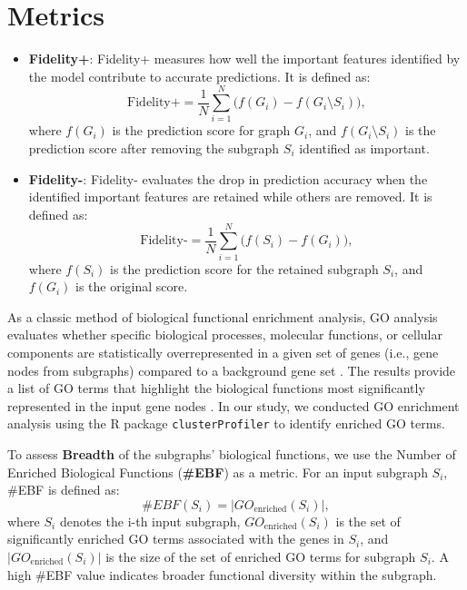 \section{Metrics}
\label{metric}


\begin{itemize}[left=0pt]
    \item \textbf{Fidelity+}: Fidelity+ measures how well the important features identified by the model contribute to accurate predictions. It is defined as:  
\[
\text{Fidelity+} = \frac{1}{N} \sum_{i=1}^{N} \big( f(G_i) - f(G_i \setminus S_i) \big),
\]
where \( f(G_i) \) is the prediction score for graph \( G_i \), and \( f(G_i \setminus S_i) \) is the prediction score after removing the subgraph \( S_i \) identified as important.
\item \textbf{Fidelity-}: Fidelity- evaluates the drop in prediction accuracy when the identified important features are retained while others are removed. It is defined as:  
\[
\text{Fidelity-} = \frac{1}{N} \sum_{i=1}^{N} \big( f(S_i) - f(G_i) \big),
\]
where \( f(S_i) \) is the prediction score for the retained subgraph \( S_i \), and \( f(G_i) \) is the original score.
\end{itemize}

As a classic method of biological functional enrichment analysis, GO analysis evaluates whether specific biological processes, molecular functions, or cellular components are statistically overrepresented in a given set of genes (i.e., gene nodes from subgraphs) compared to a background gene set \cite{enrichment}.
The results provide a list of GO terms that highlight the biological functions most significantly represented in the input gene nodes \cite{GO}.
In our study, we conducted GO enrichment analysis using the R package \texttt{clusterProfiler} \cite{clusterProfiler} to identify enriched GO terms.

To assess \textbf{Breadth} of the subgraphs' biological functions, we use the Number of Enriched Biological Functions (\textbf{\#EBF}) as a metric. 
For an input subgraph \( S_i \), \#EBF is defined as:
\[
\#EBF(S_i) = |GO_{\text{enriched}}(S_i)|,
\]
where \( S_i \) denotes the i-th input subgraph, \( GO_{\text{enriched}}(S_i) \) is the set of significantly enriched GO terms associated with the genes in \( S_i \), and \( |GO_{\text{enriched}}(S_i)| \) is the size of the set of enriched GO terms for subgraph \( S_i \).
A high \#EBF value indicates broader functional diversity within the subgraph.

